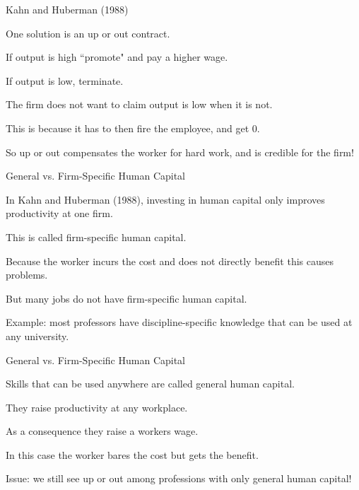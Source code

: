 \documentclass[aspectratio=169,usenames,dvipsnames]{beamer}
\newenvironment{wideitemize}{\itemize\addtolength{\itemsep}{10pt}}{\enditemize}
\begin{document}
\begin{frame}{Kahn and Huberman (1988)}

\begin{wideitemize}
    \item One solution is an up or out contract.
    \item If output is high ``promote" and pay a higher wage.
    \item If output is low, terminate.
    \item The firm does not want to claim output is low when it is not.
    \item This is because it has to then fire the employee, and get 0.
    \item So up or out compensates the worker for hard work, and is credible for the firm!
\end{wideitemize}
    
\end{frame}


\begin{frame}{General vs. Firm-Specific Human Capital}
    \begin{wideitemize}
        \item In Kahn and Huberman (1988), investing in human capital only improves productivity at one firm.
        \item This is called firm-specific human capital.
        \item Because the worker incurs the cost and does not directly benefit this causes problems.
        \item But many jobs do not have firm-specific human capital.
        \item Example: most professors have discipline-specific knowledge that can be used at any university.
    \end{wideitemize}
\end{frame}


\begin{frame}{General vs. Firm-Specific Human Capital}
    \begin{wideitemize}
        \item Skills that can be used anywhere are called general human capital.
        \item They raise productivity at any workplace.
        \item As a consequence they raise a workers wage.
        \item In this case the worker bares the cost but gets the benefit.
        \item Issue: we still see up or out among professions with only general human capital!
    \end{wideitemize}
\end{frame}
\end{document}
